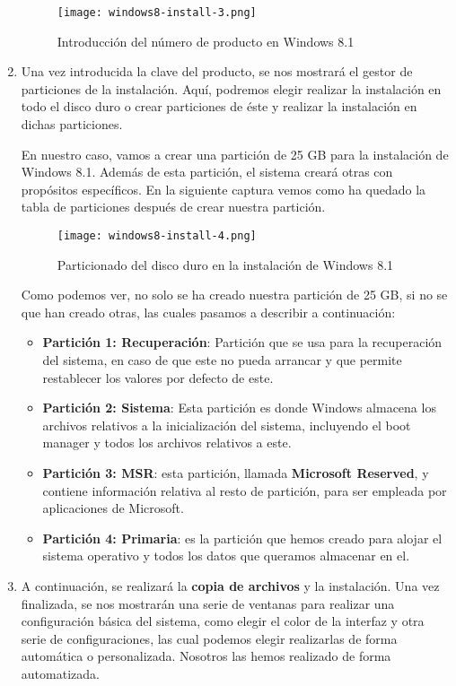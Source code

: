 \begin{enumerate}
    \begin{figure}[H]
        \centering
        \texttt{[image: windows8-install-3.png]}
        \caption{Introducción del número de producto en Windows 8.1}
    \end{figure}

    \item Una vez introducida la clave del producto, se nos mostrará el gestor de particiones de la instalación. Aquí, podremos elegir realizar la instalación en todo el disco duro o crear particiones de éste y realizar la instalación en dichas particiones.

    En nuestro caso, vamos a crear una partición de 25 GB para la instalación de Windows 8.1. Además de esta partición, el sistema creará otras con propósitos específicos. En la siguiente captura vemos como ha quedado la tabla de particiones después de crear nuestra partición.

    \begin{figure}[H]
        \centering
        \texttt{[image: windows8-install-4.png]}
        \caption{Particionado del disco duro en la instalación de Windows 8.1}
    \end{figure}

    Como podemos ver, no solo se ha creado nuestra partición de 25 GB, si no se que han creado otras, las cuales pasamos a describir a continuación:

    \begin{itemize}
        \item \textbf{Partición 1: Recuperación}: Partición que se usa para la recuperación del sistema, en caso de que este no pueda arrancar y que permite restablecer los valores por defecto de este.
        \item \textbf{Partición 2: Sistema}: Esta partición es donde Windows almacena los archivos relativos a la inicialización del sistema, incluyendo el boot manager y todos los archivos relativos a este.
        \item \textbf{Partición 3: MSR}: esta partición, llamada \textbf{Microsoft Reserved}, y contiene información relativa al resto de partición, para ser empleada por aplicaciones de Microsoft.
        \item \textbf{Partición 4: Primaria}: es la partición que hemos creado para alojar el sistema operativo y todos los datos que queramos almacenar en el.
    \end{itemize}

    \item A continuación, se realizará la \textbf{copia de archivos} y la instalación. Una vez finalizada, se nos mostrarán una serie de ventanas para realizar una configuración básica del sistema, como elegir el color de la interfaz y otra serie de configuraciones, las cual podemos elegir realizarlas de forma automática o personalizada. Nosotros las hemos realizado de forma automatizada.


\end{enumerate}
